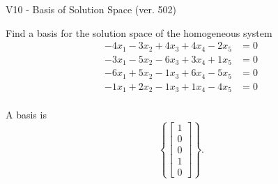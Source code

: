 \begin{exercise}
  \begin{exerciseTitle}V10 - Basis of Solution Space (ver. 502)\end{exerciseTitle}
  \begin{exerciseStatement}
    Find a basis for the solution space of the homogeneous system 
\begin{align*}
 -4 x_ 1 -3 x_ 2 + 4 x_ 3 + 4 x_ 4 -2 x_ 5 &= 0  \\ 
  -3 x_ 1 -5 x_ 2 -6 x_ 3 + 3 x_ 4 + 1 x_ 5 &= 0  \\ 
  -6 x_ 1 + 5 x_ 2 -1 x_ 3 + 6 x_ 4 -5 x_ 5 &= 0  \\ 
  -1 x_ 1 + 2 x_ 2 -1 x_ 3 + 1 x_ 4 -4 x_ 5 &= 0  \\ 
 \end{align*}


 
  \end{exerciseStatement}

  \begin{exerciseAnswer}
   A basis is   
\[\left\{\left[\begin{array}{c}
1 \\
0 \\
0 \\
1 \\
0
\end{array}\right]\right\}.\]

  


  \end{exerciseAnswer}
\end{exercise}